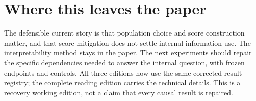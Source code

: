 \documentclass[10pt]{article}
\begin{document}
\section{Where this leaves the paper}
The defensible current story is that population choice and score construction
matter, and that score mitigation does not settle internal information use.
The interpretability method stays in the paper. The next experiments should
repair the specific dependencies needed to answer the internal question, with
frozen endpoints and controls. All three editions now use the same corrected
result registry; the complete reading edition carries the technical details.
This is a recovery working edition, not a claim that every causal result is repaired.
\end{document}
